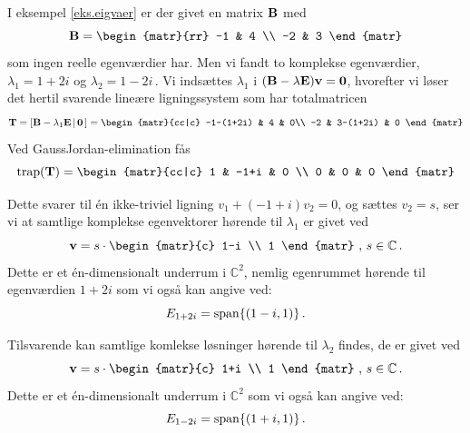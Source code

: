 \begin{example}\label{komplexex}
I eksempel \ref{eks.eigvaer} er der givet en matrix $ \mathbf{B} $ med
\begin{equation}
\mB = \begin{matr}{rr} -1 & 4 \\ -2 & 3 \end{matr}
\end{equation}
som ingen reelle egenværdier har. Men vi fandt to komplekse egenværdier, $\lambda_1=1+2i$ og $\lambda_2=1-2i\,.$\bs
Vi indsættes $\lambda_1$ i 
$ (\mathbf{B} - \lambda \mathbf{E}) \mathbf{v} = \bm{0} $, hvorefter vi løser det hertil svarende lineære ligningssystem som har totalmatricen
\begin{equation}
\mathbf T=\left[\mB - \lambda_1 \mE\,|\, \mnul\,\right]=
\begin{matr}{cc|c} -1-(1+2i) & 4 & 0\\ -2 & 3-(1+2i) & 0 \end{matr}
\end{equation}
Ved GaussJordan-elimination fås  
\begin{equation}
\mathrm{trap}(\mathbf T)=
\begin{matr}{cc|c} 1 & -1+i & 0 \\ 0 & 0 & 0 \end{matr}
\end{equation}

Dette svarer til én ikke-triviel ligning $ v_1 + (-1+i)v_2 = 0 $, og sættes $ v_2 = s $, ser vi at samtlige komplekse egenvektorer hørende til $ \lambda_1 $ er givet ved
\begin{equation}
\mv=
s \cdot \begin{matr}{c} 1-i \\ 1 \end{matr}\,\,,\,s \in \mathbb C\,.
\end{equation}
Dette er et én-dimensionalt underrum i $ \mathbb C^2 $, nemlig egenrummet hørende til egenværdien $1+2i$ som vi også kan angive ved:
\begin{equation}
E_{1+2i}=\mathrm{span}\{(1-i,1)\}\,.
\end{equation}

Tilsvarende kan samtlige komlekse løsninger hørende til $ \lambda_2 $ findes, de er givet ved
\begin{equation}
\mv=
s \cdot \begin{matr}{c} 1+i \\ 1 \end{matr}\,\,,\,s \in \mathbb C\,.
\end{equation}
Dette er et én-dimensionalt underrum i $ \mathbb C^2 $ som vi også kan angive ved:
\begin{equation}
E_{1-2i}=\mathrm{span}\{(1+i,1)\}\,.
\end{equation}
\end{example}

